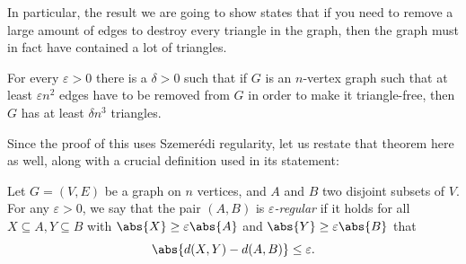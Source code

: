 \documentclass[nobib]{tufte-handout}
\begin{document}
In particular, the result we are going to show states that if you need to remove a large amount of edges to destroy every triangle in the graph, then the graph must in fact have contained a lot of triangles.

\begin{theorem}\label{thm:triangle_removal}
    For every $\varepsilon > 0$ there is a $\delta > 0$ such that if $G$ is an $n$-vertex graph such that at least $\varepsilon n^2$ edges have to be removed from $G$ in order to make it triangle-free, then $G$ has at least $\delta n^3$ triangles.
\end{theorem}

Since the proof of this uses Szemerédi regularity, let us restate that theorem here as well, along with a crucial definition used in its statement:

\begin{definition}
    Let $G = (V,E)$ be a graph on $n$ vertices, and $A$ and $B$ two disjoint subsets of $V$. For any $\varepsilon > 0$, we say that the pair $(A,B)$ is \emph{$\varepsilon$-regular} if it holds for all $X \subseteq A, Y \subseteq B$ with $\abs{X} \geq \varepsilon\abs{A}$ and $\abs{Y} \geq \varepsilon\abs{B}$ that
    $$\abs{d(X,Y) - d(A,B)} \leq \varepsilon.$$
\end{definition}
\end{document}
